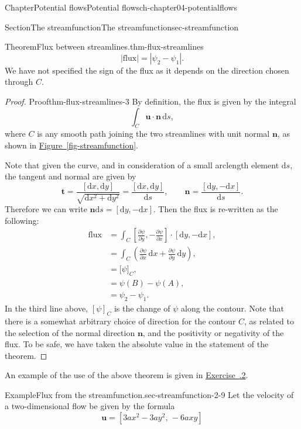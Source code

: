 \documentclass[oneside,10pt,]{book}
\newcommand{\xreffont}{\relax}
\numberwithin{equation}{section}
\newcommand{\de}{\mathrm{d}}
\newcommand{\pd}[2]{\frac{\partial#1}{\partial#2}}
\newcommand{\bn}{\boldsymbol{n}}
\newcommand{\bt}{\boldsymbol{t}}
\newcommand{\bu}{\boldsymbol{u}}
\renewcommand{\bt}{\boldsymbol{t}}
\newcommand{\amp}{&}
\begin{document}
\begin{chapterptx}{Chapter}{Potential flows}{}{Potential flows}{}{}{ch-chapter04-potentialflows}
\begin{sectionptx}{Section}{The streamfunction}{}{The streamfunction}{}{}{sec-streamfunction}
\begin{introduction}{}
\begin{theorem}{Theorem}{Flux between streamlines.}{}{thm-flux-streamlines}
\begin{equation*}
|\textrm{flux}| = |\psi_2 - \psi_1|.
\end{equation*}
We have not specified the sign of the flux as it depends on the direction chosen through \(C\).%
\end{theorem}
\begin{proof}{Proof}{}{thm-flux-streamlines-3}
By definition, the flux is given by the integral%
\begin{equation*}
\int_C \bu \cdot \bn \, \de{s},
\end{equation*}
where \(C\) is any smooth path joining the two streamlines with unit normal \(\bn\), as shown in \hyperref[fig-streamfunction]{Figure~{\xreffont\ref{fig-streamfunction}}}.%
\par
Note that given the curve, and in consideration of a small arclength element \(\de{s}\), the tangent and normal are given by%
\begin{equation*}
\bt = \frac{[\de{x}, \de{y}]}{\sqrt{\de{x}^2 + \de{y}^2}} = \frac{[\de{x}, \de{y}]}{\de{s}}, \qquad 
\bn = \frac{[\de{y}, -\de{x}]}{\de{s}}.
\end{equation*}
Therefore we can write \(\bn \de{s} = [\de{y}, -\de{x}]\). Then the flux is re-written as the following:%
\begin{align*}
\textrm{flux} \amp= \int_C \left[\pd{\psi}{y}, -\pd{\psi}{x}\right] \cdot [\de{y}, -\de{x}], \\
\amp= \int_C \left(\pd{\psi}{x} \, \de{x} + \pd{\psi}{y} \, \de{y} \right), \\
\amp= \bigl[ \psi \bigr]_C, \\
\amp= \psi(B) - \psi(A), \\
\amp= \psi_2 - \psi_1. 
\end{align*}
In the third line above, \([\psi]_C\) is the change of \(\psi\) along the contour. Note that there is a somewhat arbitrary choice of direction for the contour \(C\), as related to the selection of the normal direction \(\bn\), and the positivity or negativity of the flux. To be safe, we have taken the absolute value in the statement of the theorem.%
\end{proof}
An example of the use of the above theorem is given in \hyperlink{ex-hw-potential-fluxcalc}{Exercise~{\xreffont 4.7.2}}.%
\begin{example}{Example}{Flux from the streamfunction.}{sec-streamfunction-2-9}%
Let the velocity of a two-dimensional flow be given by the formula%
\begin{equation*}
\bu = [3ax^2 - 3ay^2, \, -6axy]

\end{equation*}
\end{example}
\end{introduction}
\end{sectionptx}
\end{chapterptx}
\end{document}
